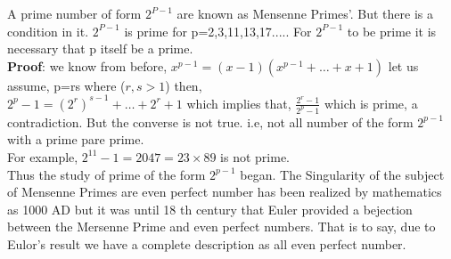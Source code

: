 \documentclass[12pt,,a4paper]{book}
\begin{document}
 A prime number of form \(2^{P-1}\) are known as Mensenne Primes'. But there is a condition in it. \(2^{P-1}\) is prime for p=2,3,11,13,17.....
 For \(2^{P-1}\) to be prime it is necessary that p itself be a prime.\\
\textbf{Proof}: we know from before, $x^{p-1} = (x-1)(x^{p-1} + \ldots + x + 1)$ let us assume, p=rs where (\(r, s > 1\)) then, \\
 \(2^p-1 = (2^r)^{s-1}+\ldots+2^r+1\) which implies that, \(\frac{{2^r-1}}{{2^p-1}}\)  which is prime, a contradiction. But the converse is not true. i.e, not all number of the form \(2^{p-1}\) with a prime pare prime. \\
For example, \(2^{11}-1=2047=23 \times 89\) is not prime. \\
Thus the study of prime of the form \(2^{p-1}\) began. The Singularity of the subject of Mensenne Primes are even perfect number has been realized by mathematics as 1000 AD but it was until 18 th century that Euler provided a bejection between the Mersenne Prime and even perfect numbers. That is to say, due to Eulor's result we have a complete description as all even perfect number. \\ \vspace{20pt}
\end{document}
